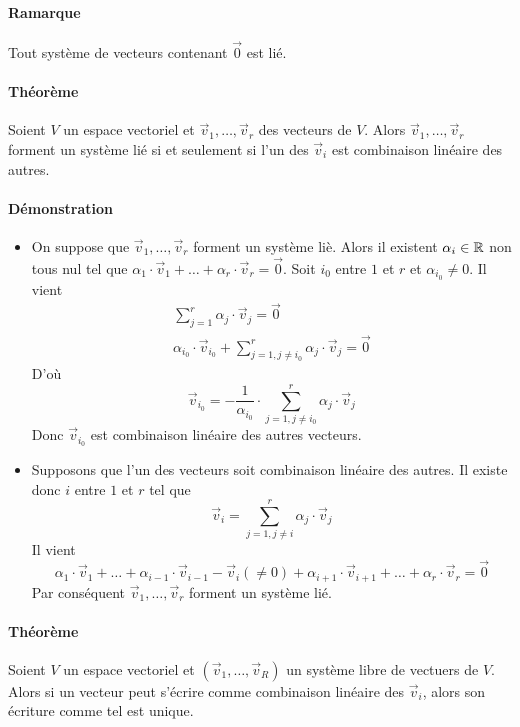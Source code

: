 \paragraph{Ramarque} Tout système de vecteurs contenant $\vec{0}$ est lié.

\paragraph{Théorème} Soient $V$ un espace vectoriel et $\vec{v}_1, \ldots, \vec{v}_r$ des vecteurs de $V$. Alors $\vec{v}_1, \ldots, \vec{v}_r$ forment un système lié si et seulement si l'un des $\vec{v}_i$ est combinaison linéaire des autres.
\paragraph{Démonstration} 
\begin{itemize}
  \item On suppose que $\vec{v}_1, \ldots, \vec{v}_r$ forment un système liè. Alors il existent $\alpha_i \in \mathbb{R}$ non tous nul tel que $\alpha_1 \cdot \vec{v}_1 + \ldots + \alpha_r \cdot \vec{v}_r = \vec{0}$. Soit $i_0$ entre $1$ et $r$ et $\alpha_{i_0} \neq 0$. Il vient
    \begin{eqnarray*}
      \sum_{j=1}^{r} \alpha_j \cdot \vec{v}_j = \vec{0} \\
      \alpha_{i_0} \cdot \vec{v}_{i_0} + \sum_{j=1, j \neq i_0}^{r} \alpha_j \cdot \vec{v}_j = \vec{0}
    \end{eqnarray*}
    D'où
    $$\vec{v}_{i_0} = -\frac{1}{\alpha_{i_0}} \cdot \sum_{j=1, j \neq i_0}^{r} \alpha_j \cdot \vec{v}_j$$
    Donc $\vec{v}_{i_0}$ est combinaison linéaire des autres vecteurs.
  
  \item Supposons que l'un des vecteurs soit combinaison linéaire des autres. Il existe donc $i$ entre $1$ et $r$ tel que 
    $$\vec{v}_i = \sum_{j=1, j \neq i}^{r} \alpha_j \cdot \vec{v}_j$$
    Il vient 
    $$\alpha_1 \cdot \vec{v}_1 + \ldots + \alpha_{i-1} \cdot \vec{v}_{i-1} - \vec{v}_i (\neq 0) + \alpha_{i+1} \cdot \vec{v}_{i+1} + \ldots + \alpha_r \cdot \vec{v}_r = \vec{0}$$
    Par conséquent $\vec{v}_1, \ldots, \vec{v}_r$ forment un système lié.
\end{itemize}

\paragraph*{Théorème} Soient $V$ un espace vectoriel et $(\vec{v}_1, \ldots, \vec{v}_R)$ un système libre de vectuers de $V$. Alors si un vecteur peut s'écrire comme combinaison linéaire des $\vec{v}_i$, alors son écriture comme tel est unique.

